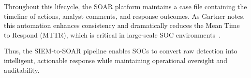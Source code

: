 Throughout this lifecycle, the SOAR platform maintains a case file containing the timeline of actions, analyst comments, and response outcomes. As Gartner notes, this automation enhances consistency and dramatically reduces the Mean Time to Respond (MTTR), which is critical in large-scale SOC environments~\cite{gartner-siem-soar}.

Thus, the SIEM-to-SOAR pipeline enables SOCs to convert raw detection into intelligent, actionable response while maintaining operational oversight and auditability.
